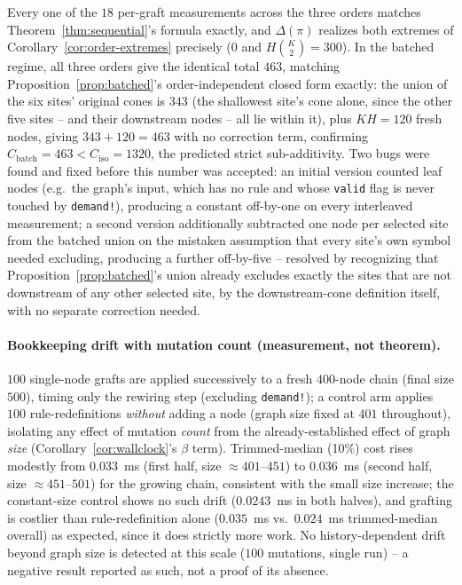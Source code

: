 \documentclass[11pt,a4paper]{article}
\begin{document}
Every one of the $18$ per-graft measurements across the three orders matches
Theorem~\ref{thm:sequential}'s formula exactly, and $\Delta(\pi)$ realizes both extremes of
Corollary~\ref{cor:order-extremes} precisely ($0$ and $H\binom{K}{2}=300$). In the batched regime,
all three orders give the identical total $463$, matching Proposition~\ref{prop:batched}'s
order-independent closed form exactly: the union of the six sites' original cones is $343$ (the
shallowest site's cone alone, since the other five sites -- and their downstream nodes -- all lie
within it), plus $KH=120$ fresh nodes, giving $343+120=463$ with no correction term, confirming
$C_{\mathrm{batch}} = 463 < C_{\mathrm{iso}} = 1320$, the predicted strict sub-additivity. Two
bugs were found and fixed before this number was accepted: an initial version counted leaf nodes
(e.g.\ the graph's input, which has no rule and whose \texttt{valid} flag is never touched by
\texttt{demand!}), producing a constant off-by-one on every interleaved measurement; a second
version additionally subtracted one node per selected site from the batched union on the mistaken
assumption that every site's own symbol needed excluding, producing a further off-by-five --
resolved by recognizing that Proposition~\ref{prop:batched}'s union already excludes exactly the
sites that are not downstream of any other selected site, by the downstream-cone definition itself,
with no separate correction needed.

\paragraph{Bookkeeping drift with mutation count (measurement, not theorem).} $100$ single-node
grafts are applied successively to a fresh $400$-node chain (final size $500$), timing only the
rewiring step (excluding \texttt{demand!}); a control arm applies $100$ rule-redefinitions
\emph{without} adding a node (graph size fixed at $401$ throughout), isolating any effect of
mutation \emph{count} from the already-established effect of graph \emph{size}
(Corollary~\ref{cor:wallclock}'s $\beta$ term). Trimmed-median (10\%) cost rises modestly from
$0.033$~ms (first half, size $\approx 401$--$451$) to $0.036$~ms (second half, size $\approx
451$--$501$) for the growing chain, consistent with the small size increase; the constant-size
control shows no such drift ($0.0243$~ms in both halves), and grafting is costlier than
rule-redefinition alone ($0.035$~ms vs.\ $0.024$~ms trimmed-median overall) as expected, since it
does strictly more work. No history-dependent drift beyond graph size is detected at this scale
($100$ mutations, single run) -- a negative result reported as such, not a proof of its absence.
\end{document}
